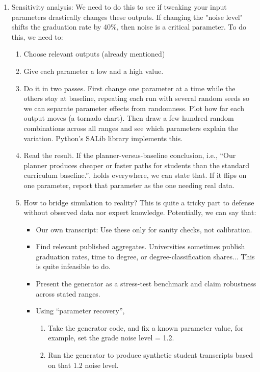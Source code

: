 \documentclass[10pt,a4paper]{article}
\begin{document}
\begin{enumerate}
    \item Sensitivity analysis: We need to do this to see if tweaking your input parameters drastically changes these outputs. If changing the "noise level" shifts the graduation rate by 40\%, then noise is a critical parameter. To do this, we need to:
    \begin{enumerate}
        \item Choose relevant outputs (already mentioned)
        \item Give each parameter a low and a high value.
        \item Do it in two passes. First change one parameter at a time while the others stay at baseline, repeating each run with several random seeds so we can separate parameter effects from randomness. Plot how far each output moves (a tornado chart). Then draw a few hundred random combinations across all ranges and see which parameters explain the variation. Python’s SALib library implements this.
        \item Read the result. If the planner-versus-baseline conclusion, i.e., ``Our planner produces cheaper or faster paths for students than the standard curriculum baseline.'', holds everywhere, we can state that. If it flips on one parameter, report that parameter as the one needing real data.

        \item How to bridge simulation to reality? This is quite a tricky part to defense without observed data nor expert knowledge. Potentially, we can say that:
        \begin{itemize}
            \item Our own transcript: Use these only for sanity checks, not calibration.
            \item Find relevant published aggregates. Universities sometimes publish graduation rates, time to degree, or degree-classification shares... This is quite infeasible to do.
            \item Present the generator as a stress-test benchmark and claim robustness across stated ranges.
            \item Using ``parameter recovery'', 
            \begin{enumerate}
                \item Take the generator code, and fix a known parameter value, for example, set the grade noise level = 1.2.

                \item Run the generator to produce synthetic student transcripts based on that 1.2 noise level.


\end{enumerate}
\end{itemize}
\end{enumerate}
\end{enumerate}
\end{document}
